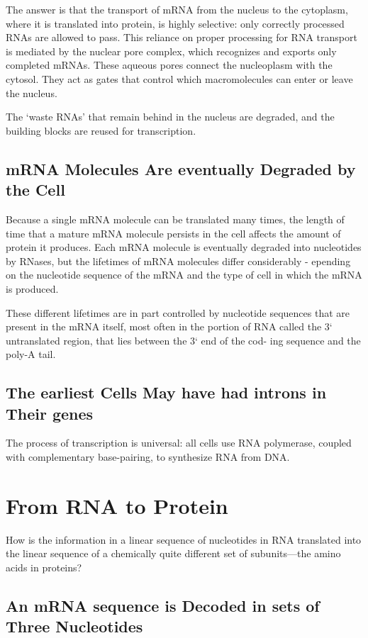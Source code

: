 The answer is that the transport of mRNA from the nucleus to the
cytoplasm, where it is translated into protein, is highly selective: only
correctly processed RNAs are allowed to pass. This reliance on proper
processing for RNA transport is mediated by the nuclear pore complex,
which recognizes and exports only completed mRNAs. These aqueous
pores connect the nucleoplasm with the cytosol.
They act as gates that control which macromolecules can
enter or leave the nucleus.

The ‘waste RNAs’ that remain behind in the nucleus are degraded, and the building
blocks are reused for transcription.

\subsection{mRNA Molecules Are eventually Degraded by the Cell}

Because a single mRNA molecule can be translated many times, the length of time
that a mature mRNA molecule persists in the cell affects the amount of protein it produces.
Each mRNA molecule is eventually degraded into nucleotides by RNases, but the lifetimes
of mRNA molecules differ considerably - epending on the nucleotide
sequence of the mRNA and the type of cell in which the mRNA is produced.

These different lifetimes are in part controlled by nucleotide sequences
that are present in the mRNA itself, most often in the portion of RNA
called the 3` untranslated region, that lies between the 3` end of the cod-
ing sequence and the poly-A tail.

\subsection{The earliest Cells May have had introns in Their genes}

The process of transcription is universal: all cells use RNA polymerase,
coupled with complementary base-pairing, to synthesize RNA from DNA.

\section{From RNA to Protein}

How is the information in a linear
sequence of nucleotides in RNA translated into the linear sequence of a
chemically quite different set of subunits—the amino acids in proteins?

\subsection{An mRNA sequence is Decoded in sets of Three Nucleotides}

